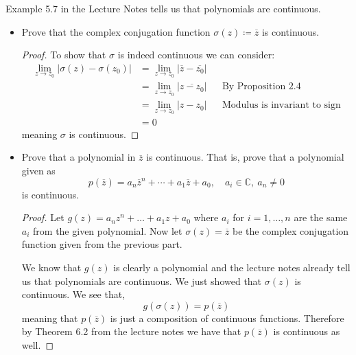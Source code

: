 \documentclass[11pt]{article}
\newenvironment{problem}[2][Problem\!]{\begin{trivlist}
\item[\hskip \labelsep {\bfseries #1}\hskip \labelsep {\bfseries #2}]}{\end{trivlist}}
\newcommand{\cc}{\mathbb C}   %
\newcommand{\abs}[1]{\left\lvert#1\right\rvert} %
\begin{document}
\begin{problem}{3.2}
Example 5.7 in the Lecture Notes tells us that polynomials are continuous. 
\begin{itemize}[itemsep=3em]
\item[(a)] Prove that the complex conjugation function $\sigma(z) \coloneqq \overline{z}$ is continuous.
\begin{proof}
  To show that $\sigma$ is indeed continuous we can consider:
  \begin{align*}
    \lim_{z\to z_0}\abs{\sigma(z) - \sigma(z_0)} &= \lim_{z\to z_0}\abs{\overline{z} - \overline{z_0}} \\
    &= \lim_{z\to z_0}\abs{\overline{z - z_0}} && \text{By Proposition 2.4} \\
    &= \lim_{z \to z_0}\abs{z - z_0} && \text{Modulus is invariant to sign} \\
    &= 0
  \end{align*}
  meaning $\sigma$ is continuous.
\end{proof}

\item[(b)] Prove that a polynomial in $\overline{z}$ is continuous. That is, prove that a polynomial given as
\[p(\overline{z}) = a_n\overline{z}^n + \cdots + a_1\overline{z} + a_0,\quad a_i \in \cc,\ a_n \neq 0\]
is continuous.
\begin{proof}
  Let $g(z) = a_nz^{n} + \dots + a_1z + a_0$ where $a_i$ for $i = 1,\dots, n$ are the same $a_i$ from the given polynomial. Now let $\sigma(z) = \overline{z}$ be the complex conjugation function given from the previous part. 

We know that $g(z)$ is clearly a polynomial and the lecture notes already tell us that polynomials are continuous. We just showed that $\sigma(z)$ is continuous. We see that,
\[g(\sigma(z)) = p(\overline{z})\]
meaning that $p(\overline{z})$ is just a composition of continuous functions. Therefore by Theorem 6.2 from the lecture notes we have that $p(\overline{z})$ is continuous as well. 
\end{proof}


\end{itemize}
\end{problem}
\end{document}
